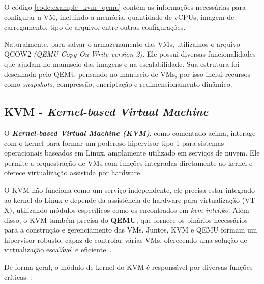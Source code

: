 O código \ref{code:example_kvm_qemu} contém as informações necessárias para configurar a VM, incluindo a memória, quantidade de vCPUs, imagem de carregamento, tipo de arquivo, entre outras configurações.

Naturalmente, para salvar o armazenamento das VMs, utilizamos o arquivo QCOW2 \textit{(QEMU Copy On Write version 2)}. Ele possui diversas funcionalidades que ajudam no manuseio das imagens e na escalabilidade. Sua estrutura foi desenhada pelo QEMU pensando no manuseio de VMs, por isso inclui recursos como \textit{snapshots}, compressão, encriptação e redimensionamento dinâmico.


\subsection{KVM - \textit{Kernel-based Virtual Machine}}

O \textit{\textbf{Kernel-based Virtual Machine (KVM)}}, como comentado acima, interage com o kernel para formar um poderoso hipervisor tipo 1 para sistemas operacionais baseados em Linux, amplamente utilizado em serviços de nuvem. Ele permite a orquestração de VMs com funções integradas diretamente ao kernel e oferece virtualização assistida por hardware.

O KVM não funciona como um serviço independente, ele precisa estar integrado ao kernel do Linux e depende da assistência de hardware para virtualização (VT-X), utilizando módulos específicos como os encontrados em \textit{kvm-intel.ko}. Além disso, o KVM também precisa do \textbf{QEMU}, que fornece os binários necessários para a construção e gerenciamento das VMs. Juntos, KVM e QEMU formam um hipervisor robusto, capaz de controlar várias VMs, oferecendo uma solução de virtualização escalável e eficiente~\citep{chirammal2016mastering}.

De forma geral, o módulo de kernel do KVM é responsável por diversas funções críticas~\citep{chirammal2016mastering}:

